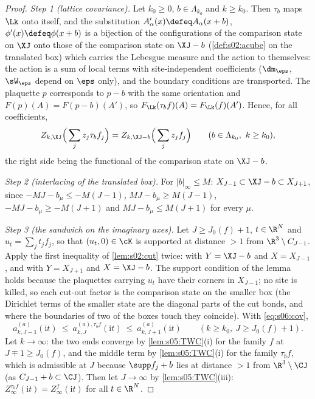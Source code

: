 \begin{proof}
\emph{Step 1 (lattice covariance).} Let $k_0\ge0$, $b\in\Lambda_{k_0}$ and $k\ge k_0$. Then $\tau_b$ maps $\Lk$ onto itself, and the substitution $A'_\alpha(x)\defeq A_\alpha(x+b)$, $\phi'(x)\defeq\phi(x+b)$ is a bijection of the configurations of the comparison state on $\XJ$ onto those of the comparison state on $\XJ-b$ (\cref{def:s02:acube} on the translated box) which carries the Lebesgue measure and the action to themselves: the action is a sum of local terms with site-independent coefficients ($\dm_\eps$, $\sW_\eps$ depend on $\eps$ only), and the boundary conditions are transported. The plaquette $p$ corresponds to $p-b$ with the same orientation and $F(p)(A)=F(p-b)(A')$, so $F_{\Lk}(\tau_bf)(A)=F_{\Lk}(f)(A')$. Hence, for all coefficients,
\begin{equation}\label{eq:s06:cov}
Z_{k,\XJ}\Big(\sum_jz_j\tau_bf_j\Big)=Z_{k,\XJ-b}\Big(\sum_jz_jf_j\Big)\qquad(b\in\Lambda_{k_0},\ k\ge k_0),
\end{equation}
the right side being the functional of the comparison state on $\XJ-b$.

\emph{Step 2 (interlacing of the translated box).} For $|b|_\infty\le M$: $X_{J-1}\subset\XJ-b\subset X_{J+1}$, since $-MJ-b_\mu\le-M(J-1)$, $MJ-b_\mu\ge M(J-1)$, $-MJ-b_\mu\ge-M(J+1)$ and $MJ-b_\mu\le M(J+1)$ for every $\mu$.

\emph{Step 3 (the sandwich on the imaginary axes).} Let $J\ge J_0(f)+1$, $t\in\R^N$ and $u_t=\sum_jt_jf_j$, so that $(u_t,0)\in\cK$ is supported at distance $>1$ from $\R^3\setminus C_{J-1}$. Apply the first inequality of \cref{lem:s02:cut} twice: with $Y=\XJ-b$ and $X=X_{J-1}$, and with $Y=X_{J+1}$ and $X=\XJ-b$. The support condition of the lemma holds because the plaquettes carrying $u_t$ have their corners in $X_{J-1}$; no site is killed, so each cut-out factor is the comparison state on the smaller box (the Dirichlet terms of the smaller state are the diagonal parts of the cut bonds, and where the boundaries of two of the boxes touch they coincide). With \eqref{eq:s06:cov},
\[
a^{(a)}_{k,J-1}(\mathrm it)\ \le\ a^{(a),\tau_bf}_{k,J}(\mathrm it)\ \le\ a^{(a)}_{k,J+1}(\mathrm it)\qquad(k\ge k_0,\ J\ge J_0(f)+1).
\]
Let $k\to\infty$: the two ends converge by \cref{lem:s05:TWC}(i) for the family $f$ at $J\mp1\ge J_0(f)$, and the middle term by \cref{lem:s05:TWC}(i) for the family $\tau_bf$, which is admissible at $J$ because $\supp f_j+b$ lies at distance $>1$ from $\R^3\setminus\CJ$ (as $C_{J-1}+b\subset\CJ$). Then let $J\to\infty$ by \cref{lem:s05:TWC}(iii): $Z^{\tau_bf}_\infty(\mathrm it)=Z^f_\infty(\mathrm it)$ for all $t\in\R^N$.


\end{proof}
